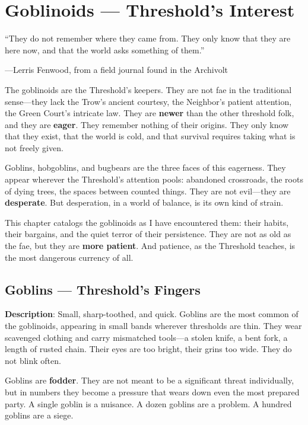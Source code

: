 \chapter{Goblinoids --- Threshold's Interest}
\label{chap:goblinoids}

\epigraph{``They do not remember where they came from. They only know that they are here now, and that the world asks something of them.''}{---Lerris Fenwood, from a field journal found in the Archivolt}

The goblinoids are the Threshold's keepers. They are not fae in the traditional sense---they lack the Trow's ancient courtesy, the Neighbor's patient attention, the Green Court's intricate law. They are \textbf{newer} than the other threshold folk, and they are \textbf{eager}. They remember nothing of their origins. They only know that they exist, that the world is cold, and that survival requires taking what is not freely given.

Goblins, hobgoblins, and bugbears are the three faces of this eagerness. They appear wherever the Threshold's attention pools: abandoned crossroads, the roots of dying trees, the spaces between counted things. They are not evil---they are \textbf{desperate}. But desperation, in a world of balance, is its own kind of strain.

This chapter catalogs the goblinoids as I have encountered them: their habits, their bargains, and the quiet terror of their persistence. They are not as old as the fae, but they are \textbf{more patient}. And patience, as the Threshold teaches, is the most dangerous currency of all.

\section{Goblins --- Threshold's Fingers}

\textbf{Description}: Small, sharp-toothed, and quick. Goblins are the most common of the goblinoids, appearing in small bands wherever thresholds are thin. They wear scavenged clothing and carry mismatched tools---a stolen knife, a bent fork, a length of rusted chain. Their eyes are too bright, their grins too wide. They do not blink often.

Goblins are \textbf{fodder}. They are not meant to be a significant threat individually, but in numbers they become a pressure that wears down even the most prepared party. A single goblin is a nuisance. A dozen goblins are a problem. A hundred goblins are a siege.

